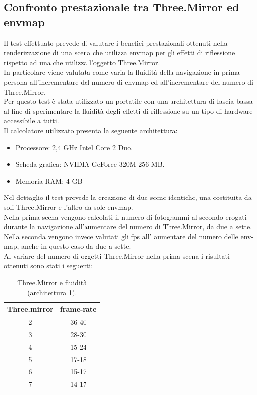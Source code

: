 \subsection{Confronto prestazionale tra Three.Mirror ed envmap}
\label{sec:chapter_prove_sperimentali_mirror_envmap}
Il test effettuato prevede di valutare i benefici prestazionali ottenuti nella renderizzazione di una scena che utilizza envmap per gli effetti di riflessione rispetto ad una che utilizza l’oggetto Three.Mirror.
\\
In particolare viene valutata come varia la fluidità della navigazione in prima persona all’incrementare del numero di envmap ed all’incrementare del numero di Three.Mirror.
\\
Per questo test è stata utilizzato un portatile con una architettura di fascia bassa al fine di sperimentare la fluidità degli effetti di riflessione su un tipo di hardware accessibile a tutti.
\\
Il calcolatore utilizzato presenta la seguente architettura:
\begin{itemize}
\item Processore: 2,4 GHz Intel Core 2 Duo.
\item Scheda grafica: NVIDIA GeForce 320M 256 MB.
\item Memoria RAM: 4 GB
\end{itemize}
Nel dettaglio il test prevede la creazione di due scene identiche, una costituita da soli Three.Mirror e l’altro da sole envmap.
\\
Nella prima scena vengono calcolati il numero di fotogrammi al secondo erogati durante la navigazione all’aumentare del numero di Three.Mirror, da due a sette.
\\
Nella seconda vengono invece valutati gli fps all’ aumentare del numero delle env-map, anche in questo caso da due a sette.
\\
Al variare del numero di oggetti Three.Mirror nella prima scena i risultati ottenuti sono stati i seguenti:
\begin{table}[h]
\centering
\caption{Three.Mirror e fluidità (architettura 1).}
\begin{tabular}{|c|c|}
\hline
\textbf{Three.mirror} & \textbf{frame-rate} \\ \hline
2 & 36-40 \\ \hline
3 & 28-30 \\ \hline
4 & 15-24 \\ \hline
5 & 17-18 \\ \hline
6 & 15-17 \\ \hline
7 & 14-17 \\ \hline
\end{tabular}
\label{table:three_mirror}
\end{table}
